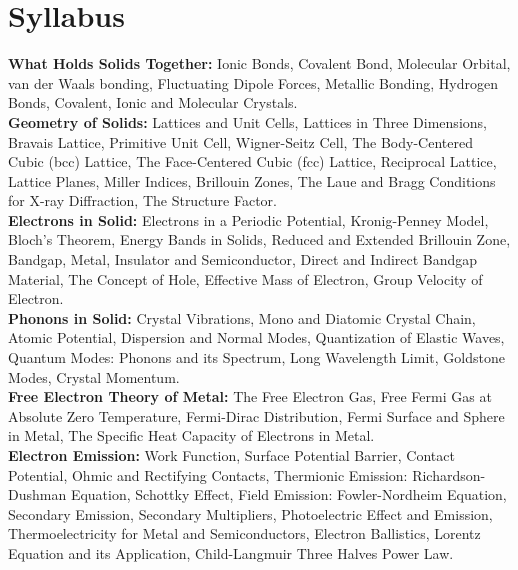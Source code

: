 \documentclass[a4aper,12pt]{report}
\begin{document}
    \chapter*{Syllabus}
    \thispagestyle{empty}
    \vspace*{-3.1cm}
    \textbf{What Holds Solids Together:} Ionic Bonds, Covalent Bond, Molecular Orbital, van der Waals bonding, Fluctuating Dipole Forces, Metallic Bonding, Hydrogen Bonds, Covalent, Ionic and Molecular Crystals. \\ [5pt]
    \textbf{Geometry of Solids:} Lattices and Unit Cells, Lattices in Three Dimensions, Bravais Lattice, Primitive Unit Cell, Wigner-Seitz Cell, The Body-Centered Cubic (bcc) Lattice, The Face-Centered Cubic (fcc) Lattice, Reciprocal Lattice, Lattice Planes, Miller Indices, Brillouin Zones, The Laue and Bragg Conditions for X-ray Diffraction, The Structure Factor. \\ [5pt]
    \textbf{Electrons in Solid: }Electrons in a Periodic Potential, Kronig-Penney Model, Bloch’s Theorem, Energy Bands in Solids, Reduced and Extended Brillouin Zone, Bandgap, Metal, Insulator and Semiconductor, Direct and Indirect Bandgap Material, The Concept of Hole, Effective Mass of Electron, Group Velocity of Electron. \\ [5pt]
    \textbf{Phonons in Solid: }Crystal Vibrations, Mono and Diatomic Crystal Chain, Atomic Potential, Dispersion and Normal Modes, Quantization of Elastic Waves, Quantum Modes: Phonons and its Spectrum, Long Wavelength Limit, Goldstone Modes, Crystal Momentum. \\ [5pt]
    \textbf{Free Electron Theory of Metal: }The Free Electron Gas, Free Fermi Gas at Absolute Zero Temperature, Fermi-Dirac Distribution, Fermi Surface and Sphere in Metal, The Specific Heat Capacity of Electrons in Metal. \\ [5pt]
    \textbf{Electron Emission: }Work Function, Surface Potential Barrier, Contact Potential, Ohmic and Rectifying Contacts, Thermionic Emission: Richardson-Dushman Equation, Schottky Effect, Field Emission: Fowler-Nordheim Equation, Secondary Emission, Secondary Multipliers, Photoelectric Effect and Emission, Thermoelectricity for Metal and Semiconductors, Electron Ballistics, Lorentz Equation and its Application, Child-Langmuir Three Halves Power Law. 
\newpage
\end{document}
